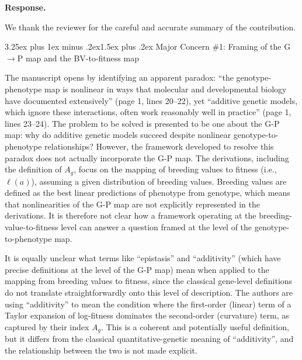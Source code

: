 \documentclass[11pt,a4paper]{article}
\makeatletter
\newcommand{\response}{%
  \par\medskip\noindent\textbf{\color{ResponseColor}Response.}\quad\ignorespaces
}
\renewcommand{\subsection}{\@startsection{subsection}{2}{0pt}%
  {3.25ex plus 1ex minus .2ex}{1.5ex plus .2ex}%
  {\large\bfseries}}
\makeatother
\begin{document}
\response
We thank the reviewer for the careful and accurate summary of the contribution.

\subsection{\texorpdfstring{Major Concern \#1: Framing of the G$\to$P map and the BV-to-fitness map}{Major Concern \#1: Framing of the G->P map and the BV-to-fitness map}}

\begin{revquote}
The manuscript opens by identifying an apparent paradox: ``the genotype-phenotype map is nonlinear in ways that molecular and developmental biology have documented extensively'' (page 1, lines 20--22), yet ``additive genetic models, which ignore these interactions, often work reasonably well in practice'' (page 1, lines 23--24). The problem to be solved is presented to be one about the G-P map: why do additive genetic models succeed despite nonlinear genotype-to-phenotype relationships? However, the framework developed to resolve this paradox does not actually incorporate the G-P map. The derivations, including the definition of $A_g$, focus on the mapping of breeding values to fitness (i.e., $\ell(a)$), assuming a given distribution of breeding values. Breeding values are defined as the best linear predictions of phenotype from genotype, which means that nonlinearities of the G-P map are not explicitly represented in the derivations. It is therefore not clear how a framework operating at the breeding-value-to-fitness level can answer a question framed at the level of the genotype-to-phenotype map.

It is equally unclear what terms like ``epistasis'' and ``additivity'' (which have precise definitions at the level of the G-P map) mean when applied to the mapping from breeding values to fitness, since the classical gene-level definitions do not translate straightforwardly onto this level of description. The authors are using ``additivity'' to mean the condition where the first-order (linear) term of a Taylor expansion of log-fitness dominates the second-order (curvature) term, as captured by their index $A_g$. This is a coherent and potentially useful definition, but it differs from the classical quantitative-genetic meaning of ``additivity'', and the relationship between the two is not made explicit.


\end{revquote}
\end{document}
